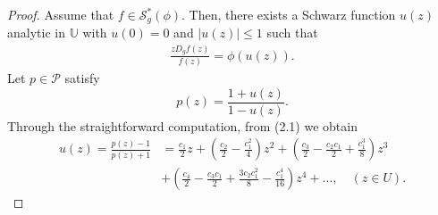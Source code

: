 \documentclass[10pt,a4paper]{amsart}
\begin{document}
\begin{proof}
Assume that $f\in\mathcal{S}^{\ast }_{g}(\phi)$. Then, there exists a Schwarz function $u(z)$ analytic in $\mathbb{U}$ with $u(0) = 0$ and $|u(z)| \leq 1$ such that
\begin{align}\label{e2.2}
\frac{zD_{g}f(z)}{f(z)}=\phi(u(z)).
\end{align}
Let $p \in \mathcal{P}$ satisfy
\begin{equation*}
p(z) = \frac{1+u(z)}{1-u(z)} .
\end{equation*}
Through the straightforward computation, from (2.1) we obtain
\begin{align*}
u(z) = \frac{p(z) - 1}{p(z) + 1} &= \frac{c_1}{2}z + \left(\frac{c_2}{2} - \frac{c_1^2}{4}\right)z^2 + \left(\frac{c_3}{2} - \frac{c_2c_1}{2} + \frac{c_1^3}{8}\right)z^3 \\
&+ \left(\frac{c_4}{2} - \frac{c_3c_1}{2} + \frac{3c_2c_1^2}{8} - \frac{c_1^4}{16}\right)z^4 + \ldots, \quad (z \in U).
\end{align*}


\end{proof}
\end{document}
